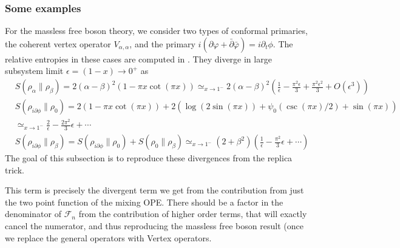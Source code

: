 \documentclass[11pt]{article}
\newcommand{\ep}{\epsilon}
\newcommand{\p}{\partial}
\newcommand{\lb}{\left(}
\newcommand{\rb}{\right)}
\begin{document}
\subsubsection{Some examples}

For the massless free boson theory, we consider two types of conformal primaries, the coherent vertex operator $V_{\alpha,\alpha}$, and the primary $i(\p\varphi+\bar{\p}\bar{\varphi})=i\p_t\phi$. The relative entropies in these cases are computed in \cite{}. They diverge in large subsystem limit $\ep=(1-x)\to 0^+$ as
\begin{align}\label{eq: free massless boson result large x limit}
&S(\rho_\alpha\|\rho_\beta)=2(\alpha-\beta)^2 (1-\pi x \cot(\pi x))\simeq_{x\to 1^-} 2(\alpha-\beta)^2\lb \frac{1}{\ep}-\frac{\pi^2\ep}{3}+\frac{\pi^2\ep^2}{3}+O(\ep^3)\rb\\
&S(\rho_{i\partial\phi}\|\rho_0)=2(1-\pi x \cot(\pi x))+2\lb \log(2\sin(\pi x))+\psi_0(\csc(\pi x)/2)+\sin(\pi x)\rb\\
&\simeq_{x\to 1^-} \frac{2}{\ep}-\frac{2\pi^2}{3}\ep+\cdots\\
&S(\rho_{i\partial\phi}\|\rho_\beta)=S(\rho_{i\partial\phi}\|\rho_0)+S(\rho_0\|\rho_\beta)\simeq_{x\to 1^-} (2+\beta^2)\lb \frac{1}{\ep}-\frac{\pi^2}{3}\ep+\cdots\rb 
\end{align}
The goal of this subsection is to reproduce these divergences from the replica trick.




This term is precisely the divergent term we get from the contribution from just the two point function of the mixing OPE. There should be a factor in the denominator of $\mathcal{F}_n$ from the contribution of higher order terms, that will exactly cancel the numerator, and thus reproducing the massless free boson result (once we replace the general operators with Vertex operators. 
\end{document}
